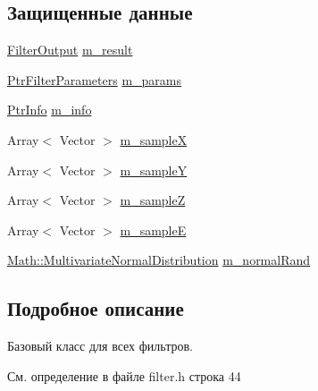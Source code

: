 \subsection*{Защищенные данные}
\begin{DoxyCompactItemize}
\item 
\hyperlink{namespace_core_a60877581a235fc9566087b54d463ce9c}{Filter\+Output} \hyperlink{class_core_1_1_filter_a1ae638614492df7edeaa2db4f528ad65}{m\+\_\+result}
\item 
\hyperlink{namespace_core_a4811af8148ba137d644b9a61a042cf03}{Ptr\+Filter\+Parameters} \hyperlink{class_core_1_1_filter_ae4d42bb0f0e6299d4edbfc310e96d09f}{m\+\_\+params}
\item 
\hyperlink{namespace_core_a647483da8a1266d5bbd3e9bb5cd66d08}{Ptr\+Info} \hyperlink{class_core_1_1_filter_a089304c3d1695bd6b47d5bfd8fcfb574}{m\+\_\+info}
\item 
Array$<$ Vector $>$ \hyperlink{class_core_1_1_filter_abed73a8bfce99d24418f6dee90c44333}{m\+\_\+sampleX}
\item 
Array$<$ Vector $>$ \hyperlink{class_core_1_1_filter_a3e2e475b650504bb7c800e3f27364580}{m\+\_\+sampleY}
\item 
Array$<$ Vector $>$ \hyperlink{class_core_1_1_filter_af0e905e89bc5db8e07f283b68fb57a60}{m\+\_\+sampleZ}
\item 
Array$<$ Vector $>$ \hyperlink{class_core_1_1_filter_acab6dcadb8caf8f05cb2beeb1deafd74}{m\+\_\+sampleE}
\item 
\hyperlink{class_math_1_1_multivariate_normal_distribution}{Math\+::\+Multivariate\+Normal\+Distribution} \hyperlink{class_core_1_1_filter_aec144b4ca46b58af15ae602a55312996}{m\+\_\+normal\+Rand}
\end{DoxyCompactItemize}


\subsection{Подробное описание}
Базовый класс для всех фильтров. 

См. определение в файле filter.\+h строка 44



